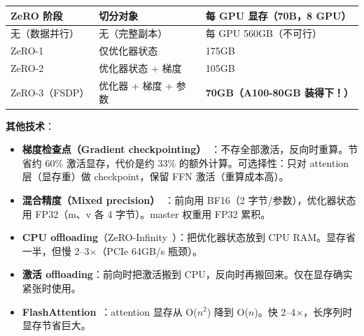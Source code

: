 \begin{center}
\begin{tabular}{@{}l l l@{}}
\toprule
\textbf{ZeRO 阶段} & \textbf{切分对象} & \textbf{每 GPU 显存（70B，8 GPU）} \\
\midrule
无（数据并行） & 无（完整副本） & 每 GPU 560GB（不可行） \\
ZeRO-1 & 仅优化器状态 & 175GB \\
ZeRO-2 & 优化器状态 + 梯度 & 105GB \\
ZeRO-3（FSDP） & 优化器 + 梯度 + 参数 & \textbf{70GB（A100-80GB 装得下！）} \\
\bottomrule
\end{tabular}
\end{center}

\textbf{其他技术}：

\begin{itemize}
  \item \textbf{梯度检查点（Gradient checkpointing）}~\cite{chen2016training}：不存全部激活，反向时重算。节省约 60\% 激活显存，代价是约 33\% 的额外计算。可选择性：只对 attention 层（显存重）做 checkpoint，保留 FFN 激活（重算成本高）。
  \item \textbf{混合精度（Mixed precision）}~\cite{micikevicius2018mixed}：前向用 BF16（2 字节/参数），优化器状态用 FP32（m、v 各 4 字节）。master 权重用 FP32 累积。
  \item \textbf{CPU offloading}（ZeRO-Infinity~\cite{rajbhandari2021zeroinfinity}）：把优化器状态放到 CPU RAM。显存省一半，但慢 2--3$\times$（PCIe 64GB/s 瓶颈）。
  \item \textbf{激活 offloading}：前向时把激活搬到 CPU，反向时再搬回来。仅在显存确实紧张时使用。
  \item \textbf{FlashAttention}~\cite{dao2022flashattention, dao2023flashattention2}：attention 显存从 O($n^2$) 降到 O($n$)。快 2--4$\times$，长序列时显存节省巨大。
\end{itemize}

